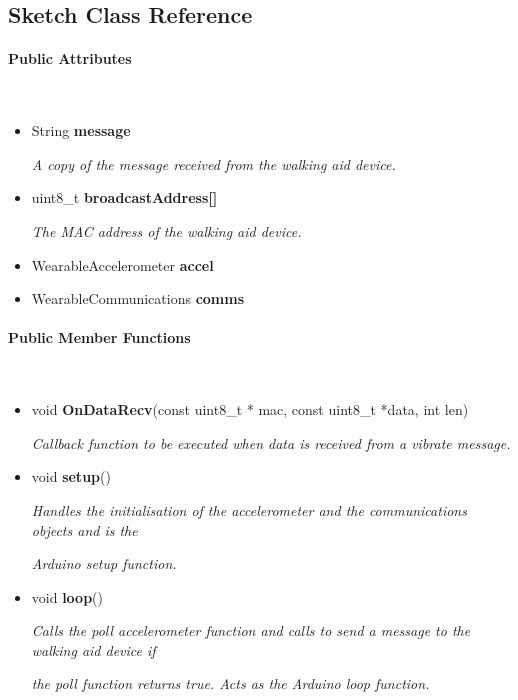 \subsection{Sketch Class Reference}
\label{subsec:sketch_wearable}\mbox{}

    \paragraph{Public Attributes}\mbox{}\\

        \begin{itemize}
            \item String \textbf{message}
            
                \quad \quad \textit{A copy of the message received from the walking aid device.}

            \item uint8\_t \textbf{broadcastAddress[]}
            
                \quad \quad \textit{The MAC address of the walking aid device.}

            \item WearableAccelerometer \textbf{accel}

            \item WearableCommunications \textbf{comms}\\

        \end{itemize}


    \paragraph{Public Member Functions}\mbox{}\\

        \begin{itemize}
            \item void \textbf{OnDataRecv}(const uint8\_t * mac, const uint8\_t *data, int len) 
            
                \quad \quad \textit{Callback function to be executed when data is received from a vibrate message.}

            \item void \textbf{setup}() 
            
                \quad \quad \textit{Handles the initialisation of the accelerometer and the communications objects and is the }

                \quad \quad \textit{Arduino setup function.}


            \item void \textbf{loop}() 
            
                \quad \quad \textit{Calls the poll accelerometer function and calls to send a message to the walking aid device if }
                
                \quad \quad \textit{the poll function returns true. Acts as the Arduino loop function.}\\
        \end{itemize}


